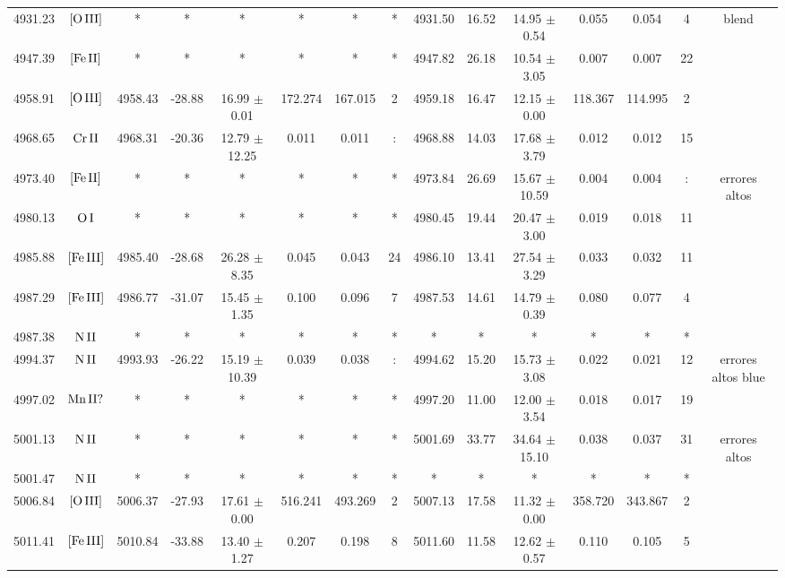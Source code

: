 \documentclass{article}
\begin{document}
\begin{table*}
\begin{adjustbox}{width=\textwidth}
\begin{tabular}{ccccccccccccccc}
4931.23 & $\mbox{[O}\thinspace \mbox{III]}$ & * & * & * & * & * & * & 4931.50 & 16.52 & 14.95 $\pm$ 0.54 & 0.055 & 0.054 & 4 &  blend \\
4947.39 & $\mbox{[Fe}\thinspace \mbox{II]}$ & * & * & * & * & * & * & 4947.82 & 26.18 & 10.54 $\pm$ 3.05 & 0.007 & 0.007 & 22 &  \\
4958.91 & $\mbox{[O}\thinspace \mbox{III]}$ & 4958.43 & -28.88 & 16.99 $\pm$ 0.01 & 172.274 & 167.015 & 2 & 4959.18 & 16.47 & 12.15 $\pm$ 0.00 & 118.367 & 114.995 & 2 &  \\
4968.65 & $\mbox{Cr}\thinspace \mbox{II}$ & 4968.31 & -20.36 & 12.79 $\pm$ 12.25 & 0.011 & 0.011 & : & 4968.88 & 14.03 & 17.68 $\pm$ 3.79 & 0.012 & 0.012 & 15 &  \\
4973.40 & $\mbox{[Fe}\thinspace \mbox{II]}$ & * & * & * & * & * & * & 4973.84 & 26.69 & 15.67 $\pm$ 10.59 & 0.004 & 0.004 & : &  errores altos \\
4980.13 & $\mbox{O}\thinspace \mbox{I}$ & * & * & * & * & * & * & 4980.45 & 19.44 & 20.47 $\pm$ 3.00 & 0.019 & 0.018 & 11 &  \\
4985.88 & $\mbox{[Fe}\thinspace \mbox{III]}$ & 4985.40 & -28.68 & 26.28 $\pm$ 8.35 & 0.045 & 0.043 & 24 & 4986.10 & 13.41 & 27.54 $\pm$ 3.29 & 0.033 & 0.032 & 11 &  \\
4987.29 & $\mbox{[Fe}\thinspace \mbox{III]}$ & 4986.77 & -31.07 & 15.45 $\pm$ 1.35 & 0.100 & 0.096 & 7 & 4987.53 & 14.61 & 14.79 $\pm$ 0.39 & 0.080 & 0.077 & 4 &  \\
4987.38 & $\mbox{N}\thinspace \mbox{II}$ & * & * & * & * & * & * & * & * & * & * & * & * &  \\
4994.37 & $\mbox{N}\thinspace \mbox{II}$ & 4993.93 & -26.22 & 15.19 $\pm$ 10.39 & 0.039 & 0.038 & : & 4994.62 & 15.20 & 15.73 $\pm$ 3.08 & 0.022 & 0.021 & 12 &  errores altos blue \\
4997.02 & $\mbox{Mn}\thinspace \mbox{II?}$ & * & * & * & * & * & * & 4997.20 & 11.00 & 12.00 $\pm$ 3.54 & 0.018 & 0.017 & 19 &  \\
5001.13 & $\mbox{N}\thinspace \mbox{II}$ & * & * & * & * & * & * & 5001.69 & 33.77 & 34.64 $\pm$ 15.10 & 0.038 & 0.037 & 31 &  errores altos \\
5001.47 & $\mbox{N}\thinspace \mbox{II}$ & * & * & * & * & * & * & * & * & * & * & * & * &  \\
5006.84 & $\mbox{[O}\thinspace \mbox{III]}$ & 5006.37 & -27.93 & 17.61 $\pm$ 0.00 & 516.241 & 493.269 & 2 & 5007.13 & 17.58 & 11.32 $\pm$ 0.00 & 358.720 & 343.867 & 2 &  \\
5011.41 & $\mbox{[Fe}\thinspace \mbox{III]}$ & 5010.84 & -33.88 & 13.40 $\pm$ 1.27 & 0.207 & 0.198 & 8 & 5011.60 & 11.58 & 12.62 $\pm$ 0.57 & 0.110 & 0.105 & 5 &  \\

\end{tabular}
\end{adjustbox}
\end{table*}
\end{document}
